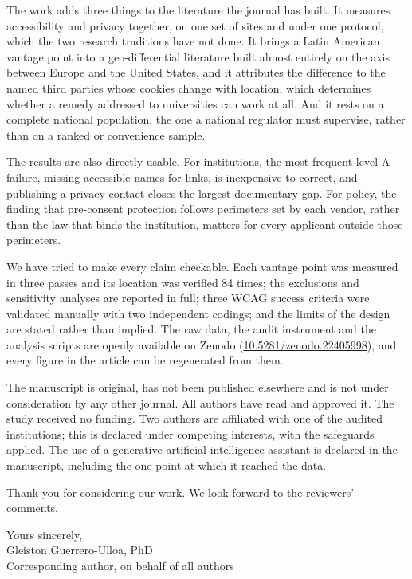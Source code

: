 \documentclass[11pt,a4paper]{article}
\begin{document}
The work adds three things to the literature the journal has built. It measures accessibility and privacy together, on one set of sites and under one protocol, which the two research traditions have not done. It brings a Latin American vantage point into a geo-differential literature built almost entirely on the axis between Europe and the United States, and it attributes the difference to the named third parties whose cookies change with location, which determines whether a remedy addressed to universities can work at all. And it rests on a complete national population, the one a national regulator must supervise, rather than on a ranked or convenience sample.

The results are also directly usable. For institutions, the most frequent level-A failure, missing accessible names for links, is inexpensive to correct, and publishing a privacy contact closes the largest documentary gap. For policy, the finding that pre-consent protection follows perimeters set by each vendor, rather than the law that binds the institution, matters for every applicant outside those perimeters.

We have tried to make every claim checkable. Each vantage point was measured in three passes and its location was verified 84 times; the exclusions and sensitivity analyses are reported in full; three WCAG success criteria were validated manually with two independent codings; and the limits of the design are stated rather than implied. The raw data, the audit instrument and the analysis scripts are openly available on Zenodo (\href{https://doi.org/10.5281/zenodo.22405998}{10.5281/zenodo.22405998}), and every figure in the article can be regenerated from them.

The manuscript is original, has not been published elsewhere and is not under consideration by any other journal. All authors have read and approved it. The study received no funding. Two authors are affiliated with one of the audited institutions; this is declared under competing interests, with the safeguards applied. The use of a generative artificial intelligence assistant is declared in the manuscript, including the one point at which it reached the data.

Thank you for considering our work. We look forward to the reviewers' comments.

\noindent\begin{minipage}{\linewidth}
	Yours sincerely,\\[1.4em]
	Gleiston Guerrero-Ulloa, PhD\\
	Corresponding author, on behalf of all authors
\end{minipage}
\end{document}
